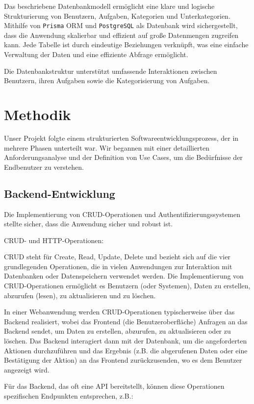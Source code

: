 \documentclass[12pt,a4paper]{article} %
\begin{document}
Das beschriebene Datenbankmodell ermöglicht eine klare und logische Strukturierung von Benutzern, Aufgaben, Kategorien und Unterkategorien. Mithilfe von \texttt{Prisma} ORM und \texttt{PostgreSQL} als Datenbank wird sichergestellt, dass die Anwendung skalierbar und effizient auf große Datenmengen zugreifen kann. Jede Tabelle ist durch eindeutige Beziehungen verknüpft, was eine einfache Verwaltung der Daten und eine effiziente Abfrage ermöglicht.


Die Datenbankstruktur unterstützt umfassende Interaktionen zwischen Benutzern, ihren Aufgaben sowie die Kategorisierung von Aufgaben.




\section{Methodik}
Unser Projekt folgte einem strukturierten Softwareentwicklungsprozess, der in mehrere Phasen unterteilt war. Wir begannen mit einer detaillierten Anforderungsanalyse und der Definition von Use Cases, um die Bedürfnisse der Endbenutzer zu verstehen.

\subsection{Backend-Entwicklung}
Die Implementierung von CRUD-Operationen und Authentifizierungssystemen stellte sicher, dass die Anwendung sicher und robust ist.

CRUD- und HTTP-Operationen:

CRUD steht für Create, Read, Update, Delete und bezieht sich auf die vier grundlegenden Operationen, die in vielen Anwendungen zur Interaktion mit Datenbanken oder Datenspeichern verwendet werden. Die Implementierung von CRUD-Operationen ermöglicht es Benutzern (oder Systemen), Daten zu erstellen, abzurufen (lesen), zu aktualisieren und zu löschen.

In einer Webanwendung werden CRUD-Operationen typischerweise über das Backend realisiert, wobei das Frontend (die Benutzeroberfläche) Anfragen an das Backend sendet, um Daten zu erstellen, abzurufen, zu aktualisieren oder zu löschen. Das Backend interagiert dann mit der Datenbank, um die angeforderten Aktionen durchzuführen und das Ergebnis (z.B. die abgerufenen Daten oder eine Bestätigung der Aktion) an das Frontend zurückzusenden, wo es dem Benutzer angezeigt wird.

Für das Backend, das oft eine API bereitstellt, können diese Operationen spezifischen Endpunkten entsprechen, z.B.:
\end{document}
